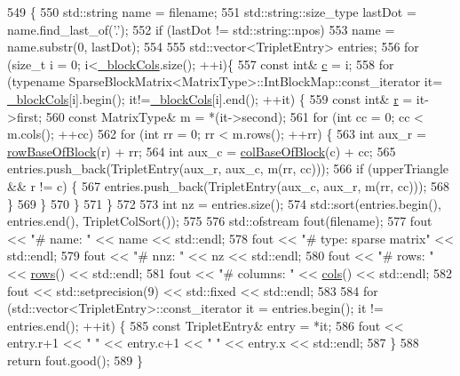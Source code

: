 \begin{DoxyCode}
549   \{
550     std::string name = filename;
551     std::string::size\_type lastDot = name.find\_last\_of(\textcolor{charliteral}{'.'});
552     \textcolor{keywordflow}{if} (lastDot != std::string::npos) 
553       name = name.substr(0, lastDot);
554 
555     std::vector<TripletEntry> entries;
556     \textcolor{keywordflow}{for} (\textcolor{keywordtype}{size\_t} i = 0; i<\hyperlink{classg2o_1_1SparseBlockMatrix_ae236d56a01ba4d292450a518621b41f8}{\_blockCols}.size(); ++i)\{
557       \textcolor{keyword}{const} \textcolor{keywordtype}{int}& \hyperlink{sparse__block__matrix_8hpp_a4e1e0e72dd773439e333c84dd762a9c3}{c} = i;
558       \textcolor{keywordflow}{for} (\textcolor{keyword}{typename} SparseBlockMatrix<MatrixType>::IntBlockMap::const\_iterator it=
      \hyperlink{classg2o_1_1SparseBlockMatrix_ae236d56a01ba4d292450a518621b41f8}{\_blockCols}[i].begin(); it!=\hyperlink{classg2o_1_1SparseBlockMatrix_ae236d56a01ba4d292450a518621b41f8}{\_blockCols}[i].end(); ++it) \{
559         \textcolor{keyword}{const} \textcolor{keywordtype}{int}& \hyperlink{sparse__block__matrix_8hpp_acab531abaa74a7e664e3986f2522b33a}{r} = it->first;
560         \textcolor{keyword}{const} MatrixType& m = *(it->second);
561         \textcolor{keywordflow}{for} (\textcolor{keywordtype}{int} cc = 0; cc < m.cols(); ++cc)
562           \textcolor{keywordflow}{for} (\textcolor{keywordtype}{int} rr = 0; rr < m.rows(); ++rr) \{
563             \textcolor{keywordtype}{int} aux\_r = \hyperlink{classg2o_1_1SparseBlockMatrix_a176a2dbe00711e248ea25dc1995c6b4c}{rowBaseOfBlock}(r) + rr;
564             \textcolor{keywordtype}{int} aux\_c = \hyperlink{classg2o_1_1SparseBlockMatrix_adf282a20d7c77c5949a0d93ca2651271}{colBaseOfBlock}(c) + cc;
565             entries.push\_back(TripletEntry(aux\_r, aux\_c, m(rr, cc)));
566             \textcolor{keywordflow}{if} (upperTriangle && r != c) \{
567               entries.push\_back(TripletEntry(aux\_c, aux\_r, m(rr, cc)));
568             \}
569           \}
570       \}
571     \}
572 
573     \textcolor{keywordtype}{int} nz = entries.size();
574     std::sort(entries.begin(), entries.end(), TripletColSort());
575 
576     std::ofstream fout(filename);
577     fout << \textcolor{stringliteral}{"# name: "} << name << std::endl;
578     fout << \textcolor{stringliteral}{"# type: sparse matrix"} << std::endl;
579     fout << \textcolor{stringliteral}{"# nnz: "} << nz << std::endl;
580     fout << \textcolor{stringliteral}{"# rows: "} << \hyperlink{classg2o_1_1SparseBlockMatrix_adf18fb267e545b9036314cf9f8f10473}{rows}() << std::endl;
581     fout << \textcolor{stringliteral}{"# columns: "} << \hyperlink{classg2o_1_1SparseBlockMatrix_ab854ca59f370d93229852e32a7b49d3e}{cols}() << std::endl;
582     fout << std::setprecision(9) << std::fixed << std::endl;
583 
584     \textcolor{keywordflow}{for} (std::vector<TripletEntry>::const\_iterator it = entries.begin(); it != entries.end(); ++it) \{
585       \textcolor{keyword}{const} TripletEntry& entry = *it;
586       fout << entry.r+1 << \textcolor{stringliteral}{" "} << entry.c+1 << \textcolor{stringliteral}{" "} << entry.x << std::endl;
587     \}
588     \textcolor{keywordflow}{return} fout.good();
589   \}
\end{DoxyCode}


